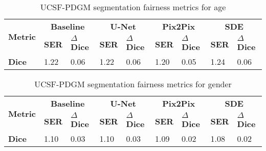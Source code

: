     \begin{table}[]
        \centering
        \caption{UCSF-PDGM segmentation fairness metrics for age}\label{tab:ucsf_age_seg}
        \begin{tabular}{l|llllllll}
        \hline
        \multirow{2}{*}{\textbf{Metric}} & \multicolumn{2}{c|}{\textbf{Baseline}}                   & \multicolumn{2}{c|}{\textbf{U-Net}}                              & \multicolumn{2}{c|}{\textbf{Pix2Pix}}                              & \multicolumn{2}{c}{\textbf{SDE}}    \\ \cline{2-9}
                                                                                            & \textbf{SER} & \textbf{$\Delta$ Dice}  & \textbf{SER} & \textbf{$\Delta$ Dice}  & \textbf{SER} & \textbf{$\Delta$ Dice} & \textbf{SER} & \textbf{$\Delta$ Dice} \\ \hline
                                                                    \textbf{Dice}  & 1.22 & 0.06 & 1.22 & 0.06 & 1.20 & 0.05 & 1.24 & 0.06 \\ \hline
        \end{tabular}
        \end{table}

    \begin{table}[]
        \centering
        \caption{UCSF-PDGM segmentation fairness metrics for gender}\label{tab:ucsf_gender_seg}
        \begin{tabular}{l|llllllll}
        \hline
        \multirow{2}{*}{\textbf{Metric}} & \multicolumn{2}{c|}{\textbf{Baseline}}                   & \multicolumn{2}{c|}{\textbf{U-Net}}                              & \multicolumn{2}{c|}{\textbf{Pix2Pix}}                              & \multicolumn{2}{c}{\textbf{SDE}}    \\ \cline{2-9}
                                                                                            & \textbf{SER} & \textbf{$\Delta$ Dice}  & \textbf{SER} & \textbf{$\Delta$ Dice}  & \textbf{SER} & \textbf{$\Delta$ Dice} & \textbf{SER} & \textbf{$\Delta$ Dice} \\ \hline
                                                                    \textbf{Dice}  & 1.10 & 0.03 & 1.10 & 0.03 & 1.09 & 0.02 & 1.08 & 0.02 \\ \hline
        \end{tabular}
        \end{table}
